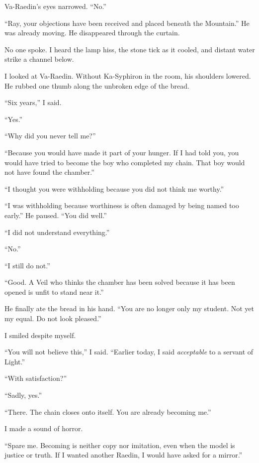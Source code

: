 Va-Raedin's eyes narrowed. ``No.''\par
``Ray, your objections have been received and placed beneath the Mountain.'' He was already moving. He disappeared through the curtain.\par
No one spoke. I heard the lamp hiss, the stone tick as it cooled, and distant water strike a channel below.\par
I looked at Va-Raedin. Without Ka-Syphiron in the room, his shoulders lowered. He rubbed one thumb along the unbroken edge of the bread.\par
``Six years,'' I said.\par
``Yes.''\par
``Why did you never tell me?''\par
``Because you would have made it part of your hunger. If I had told you, you would have tried to become the boy who completed my chain. That boy would not have found the chamber.''\par
``I thought you were withholding because you did not think me worthy.''\par
``I was withholding because worthiness is often damaged by being named too early.''
He paused. ``You did well.''\par
``I did not understand everything.''\par
``No.''\par
``I still do not.''\par
``Good. A Veil who thinks the chamber has been solved because it has been opened is unfit to stand near it.''\par
He finally ate the bread in his hand. ``You are no longer only my student. Not yet my equal. Do not look pleased.''\par
I smiled despite myself.\par
``You will not believe this,'' I said. ``Earlier today, I said \textit{acceptable} to a servant of Light.''\par
``With satisfaction?''\par
``Sadly, yes.''\par

``There. The chain closes onto itself. You are already becoming me.''\par

I made a sound of horror.\par

``Spare me. Becoming is neither copy nor imitation, even when the model is justice or truth. If I wanted another Raedin, I would have asked for a mirror.''\par

